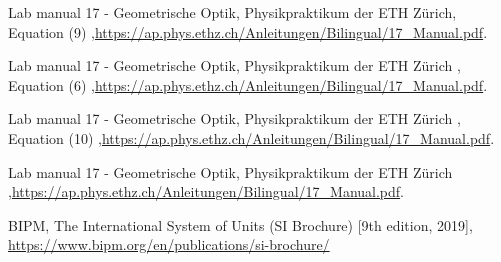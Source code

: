 
\begin{thebibliography}{99}




Lab manual 17 - Geometrische Optik, Physikpraktikum der ETH Zürich, Equation (9) ,\url{https://ap.phys.ethz.ch/Anleitungen/Bilingual/17_Manual.pdf}.

Lab manual 17 - Geometrische Optik, Physikpraktikum der ETH Zürich , Equation (6) ,\url{https://ap.phys.ethz.ch/Anleitungen/Bilingual/17_Manual.pdf}.

Lab manual 17 - Geometrische Optik, Physikpraktikum der ETH Zürich , Equation (10) ,\url{https://ap.phys.ethz.ch/Anleitungen/Bilingual/17_Manual.pdf}.

Lab manual 17 - Geometrische Optik, Physikpraktikum der ETH Zürich ,\url{https://ap.phys.ethz.ch/Anleitungen/Bilingual/17_Manual.pdf}.

BIPM, The International System of Units (SI Brochure) [9th edition, 2019],
\url{https://www.bipm.org/en/publications/si-brochure/}
\end{thebibliography}

